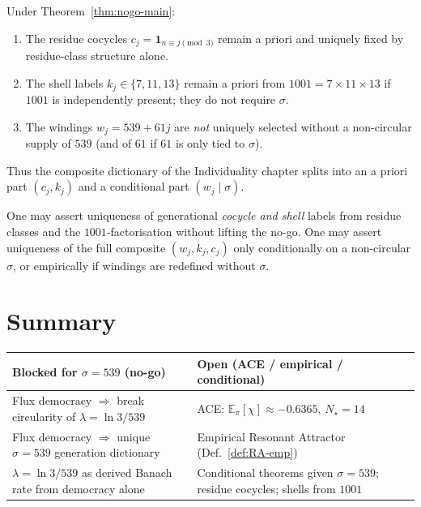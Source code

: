 \begin{theorem}
\label{thm:dict-split}
Under Theorem~\ref{thm:nogo-main}:
\begin{enumerate}[label=(\roman*)]
  \item The residue cocycles \(c_j=\mathbf{1}_{n\equiv j\pmod{3}}\) remain
        a priori and uniquely fixed by residue-class structure alone.
  \item The shell labels \(k_j\in\{7,11,13\}\) remain a priori from
        \(1001=7\times 11\times 13\) if \(1001\) is independently present; they
        do not require \(\sigma\).
  \item The windings \(w_j=539+61j\) are \emph{not} uniquely selected without
        a non-circular supply of \(539\) (and of \(61\) if \(61\) is only tied
        to \(\sigma\)).
\end{enumerate}
Thus the composite dictionary of the Individuality chapter splits into an
a priori part \((c_j,k_j)\) and a conditional part \((w_j\mid\sigma)\).
\end{theorem}

\begin{corollary}
One may assert uniqueness of generational \emph{cocycle and shell} labels from
residue classes and the \(1001\)-factorisation without lifting the no-go.
One may assert uniqueness of the full composite \((w_j,k_j,c_j)\) only
conditionally on a non-circular \(\sigma\), or empirically if windings are
redefined without \(\sigma\).
\end{corollary}

\section{Summary}
\label{sec:nogo-summary}

\begin{center}
\begin{tabular}{@{}p{}p{}@{}}
\toprule
Blocked for \(\sigma=539\) (no-go) & Open (ACE / empirical / conditional) \\
\midrule
Flux democracy \(\Rightarrow\) break circularity of \(\lambda=\ln 3/539\) &
ACE: \(\mathbb{E}_\pi[\chi]\approx -0.6365\), \(N_\star=14\) \\
Flux democracy \(\Rightarrow\) unique \(\sigma=539\) generation dictionary &
Empirical Resonant Attractor (Def.~\ref{def:RA-emp}) \\
\(\lambda=\ln 3/539\) as derived Banach rate from democracy alone &
Conditional theorems given \(\sigma=539\); residue cocycles; shells from \(1001\) \\
\bottomrule
\end{tabular}
\end{center}

